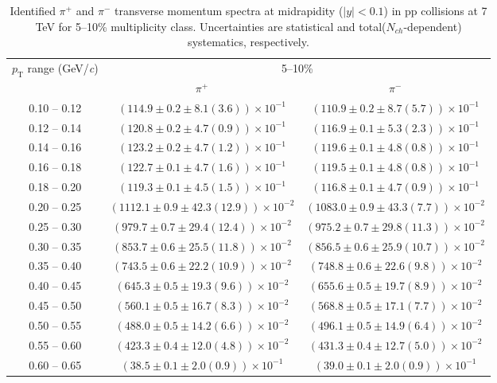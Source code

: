 \begin{table}
\caption{Identified $\pi^{+}$ and $\pi^{-}$  transverse momentum spectra at midrapidity ($|y|<0.1$) in pp collisions at 7 TeV for 5--10\% multiplicity class. Uncertainties are statistical and total($N_{ch}$-dependent) systematics, respectively.}
\label{tab:PionPlus_PionMinus_5to10}
\begin{center}
\begin{tabular}{ c | c c }
\hline
\multirow{2}{*}{$p_{\mathrm{T}}$ range (GeV/\textit{c})} & \multicolumn{2}{c}{5--10\%} \\ & $\pi^{+}$& $\pi^{-}$\\ 
\hline
0.10 -- 0.12 & $(114.9\pm0.2\pm8.1(3.6))\times10^{-1}$ & $(110.9\pm0.2\pm8.7(5.7))\times10^{-1}$ \\ 
0.12 -- 0.14 & $(120.8\pm0.2\pm4.7(0.9))\times10^{-1}$ & $(116.9\pm0.1\pm5.3(2.3))\times10^{-1}$ \\ 
0.14 -- 0.16 & $(123.2\pm0.2\pm4.7(1.2))\times10^{-1}$ & $(119.6\pm0.1\pm4.8(0.8))\times10^{-1}$ \\ 
0.16 -- 0.18 & $(122.7\pm0.1\pm4.7(1.6))\times10^{-1}$ & $(119.5\pm0.1\pm4.8(0.8))\times10^{-1}$ \\ 
0.18 -- 0.20 & $(119.3\pm0.1\pm4.5(1.5))\times10^{-1}$ & $(116.8\pm0.1\pm4.7(0.9))\times10^{-1}$ \\ 
0.20 -- 0.25 & $(1112.1\pm0.9\pm42.3(12.9))\times10^{-2}$ & $(1083.0\pm0.9\pm43.3(7.7))\times10^{-2}$ \\ 
0.25 -- 0.30 & $(979.7\pm0.7\pm29.4(12.4))\times10^{-2}$ & $(975.2\pm0.7\pm29.8(11.3))\times10^{-2}$ \\ 
0.30 -- 0.35 & $(853.7\pm0.6\pm25.5(11.8))\times10^{-2}$ & $(856.5\pm0.6\pm25.9(10.7))\times10^{-2}$ \\ 
0.35 -- 0.40 & $(743.5\pm0.6\pm22.2(10.9))\times10^{-2}$ & $(748.8\pm0.6\pm22.6(9.8))\times10^{-2}$ \\ 
0.40 -- 0.45 & $(645.3\pm0.5\pm19.3(9.6))\times10^{-2}$ & $(655.6\pm0.5\pm19.7(8.9))\times10^{-2}$ \\ 
0.45 -- 0.50 & $(560.1\pm0.5\pm16.7(8.3))\times10^{-2}$ & $(568.8\pm0.5\pm17.1(7.7))\times10^{-2}$ \\ 
0.50 -- 0.55 & $(488.0\pm0.5\pm14.2(6.6))\times10^{-2}$ & $(496.1\pm0.5\pm14.9(6.4))\times10^{-2}$ \\ 
0.55 -- 0.60 & $(423.3\pm0.4\pm12.0(4.8))\times10^{-2}$ & $(431.3\pm0.4\pm12.7(5.0))\times10^{-2}$ \\ 
0.60 -- 0.65 & $(38.5\pm0.1\pm2.0(0.9))\times10^{-1}$ & $(39.0\pm0.1\pm2.0(0.9))\times10^{-1}$ \\ 

\end{tabular}
\end{center}
\end{table}
